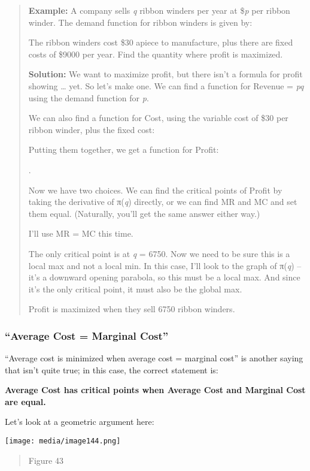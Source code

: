 \begin{quote}
\textbf{Example:} A company sells \emph{q} ribbon winders per year at
\$\emph{p} per ribbon winder. The demand function for ribbon winders is
given by:

The ribbon winders cost \$30 apiece to manufacture, plus there are fixed
costs of \$9000 per year. Find the quantity where profit is maximized.

\textbf{Solution:} We want to maximize profit, but there isn't a formula
for profit showing \ldots{} yet. So let's make one. We can find a
function for Revenue = \emph{pq} using the demand function for \emph{p}.

We can also find a function for Cost, using the variable cost of \$30
per ribbon winder, plus the fixed cost:

Putting them together, we get a function for Profit:

.

Now we have two choices. We can find the critical points of Profit by
taking the derivative of π(\emph{q}) directly, or we can find MR and MC
and set them equal. (Naturally, you'll get the same answer either way.)

I'll use MR = MC this time.

The only critical point is at \emph{q} = 6750. Now we need to be sure
this is a local max and not a local min. In this case, I'll look to the
graph of π(\emph{q}) -- it's a downward opening parabola, so this must
be a local max. And since it's the only critical point, it must also be
the global max.

Profit is maximized when they sell 6750 ribbon winders.
\end{quote}

\subsubsection{``Average Cost = Marginal
Cost''}\label{average-cost-marginal-cost}

``Average cost is minimized when average cost = marginal cost'' is
another saying that isn't quite true; in this case, the correct
statement is:

\textbf{Average Cost has critical points when Average Cost and Marginal
Cost are equal. }

Let's look at a geometric argument here:

\texttt{[image: media/image144.png]}

\begin{quote}
Figure 43
\end{quote}

